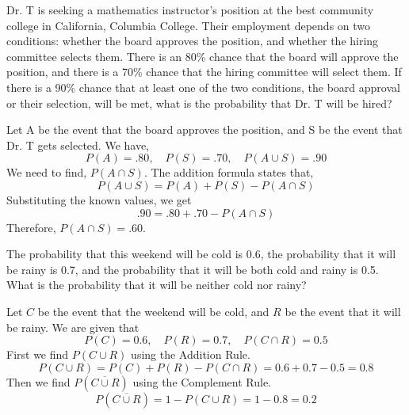 \begin{example}
    Dr. T is seeking a mathematics instructor's position at the best community college in California, Columbia College. Their employment depends on two conditions: whether the board approves the position, and whether the hiring committee selects them. There is an 80\% chance that the board will approve the position, and there is a 70\% chance that the hiring committee will select them. If there is a 90\% chance that at least one of the two conditions, the board approval or their selection, will be met, what is the probability that Dr. T will be hired?
\end{example}
\begin{solution}
    Let A be the event that the board approves the position, and S be the event that Dr. T gets selected. We have,
    \[
        P(A) = .80, \quad P(S) = .70, \quad P(A \cup S) = .90
    \]
    We need to find, \( P(A \cap S) \).
    The addition formula states that,
    \[
        P(A \cup S) = P(A) + P(S) - P(A \cap S)
    \]
    Substituting the known values, we get
    \[
        .90 = .80 + .70 - P(A \cap S)
    \]
    Therefore, \( P(A \cap S) = .60 \).
\end{solution}

\begin{example}
    The probability that this weekend will be cold is 0.6, the probability that it will be rainy is 0.7, and the probability that it will be both cold and rainy is 0.5. What is the probability that it will be neither cold nor rainy?
\end{example}
\begin{solution}
    Let \( C \) be the event that the weekend will be cold, and \( R \) be the event that it will be rainy. We are given that
    \[
        P(C) = 0.6, \quad P(R) = 0.7, \quad P(C \cap R) = 0.5
    \]
    First we find \( P(C \cup R) \) using the Addition Rule.
    \[
        P(C \cup R) = P(C) + P(R) - P(C \cap R) = 0.6 + 0.7 - 0.5 = 0.8
    \]
    Then we find \( P(\overline{C \cup R}) \) using the Complement Rule.
    \[
        P(\overline{C \cup R}) = 1 - P(C \cup R) = 1 - 0.8 = 0.2
    \]
\end{solution}
